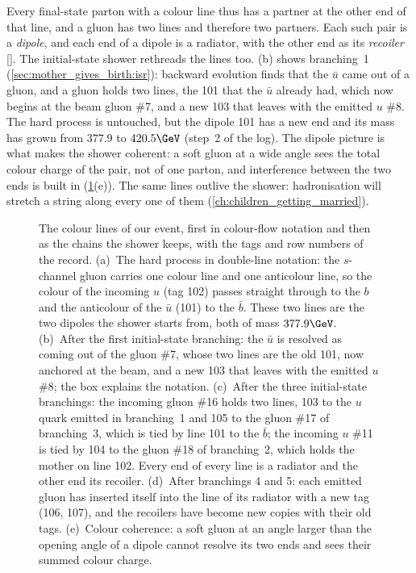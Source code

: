 Every final-state parton with a colour line thus has a partner at the
other end of that line, and a gluon has two lines and therefore two
partners. Each such pair is a \emph{dipole}, and each end of a dipole is a
radiator, with the other end as its \emph{recoiler} [].
The initial-state shower rethreads the lines too.
(b) shows branching~1
(\cref{sec:mother_gives_birth:isr}): backward evolution finds that the
$\bar u$ came out of a gluon, and a gluon holds two lines, the 101 that the
$\bar u$ already had, which now begins at the beam gluon \#7, and a new
103 that leaves with the emitted $u$ \#8. The hard process is untouched,
but the dipole 101 has a new end and its mass has grown from $377.9$ to
$420.5\GeV$ (step~2 of the log). The dipole picture is what makes the
shower coherent: a soft gluon at a wide angle sees the total colour charge
of the pair, not of one parton, and interference between the two ends is
built in (\cref{fig:mother_gives_birth:dipoles}(e)). The same lines
outlive the shower: hadronisation will stretch a string along every one of
them (\cref{ch:children_getting_married}).

\begin{figure}[htbp]\centering
\resizebox{\textwidth}{!}{}
\caption[Colour flow and dipoles of our event]{The colour lines of our
event, first in colour-flow notation and then as the chains the shower
keeps, with the tags and row numbers of the record. (a)~The hard process
in double-line notation: the $s$-channel gluon carries one colour line and
one anticolour line, so the colour of the incoming $u$ (tag 102) passes
straight through to the $b$ and the anticolour of the $\bar u$ (101) to
the $\bar b$. These two lines are the two dipoles the shower starts from,
both of mass $377.9\GeV$. (b)~After the first initial-state branching: the
$\bar u$ is resolved as coming out of the gluon \#7, whose two lines are
the old 101, now anchored at the beam, and a new 103 that leaves with the
emitted $u$ \#8; the box explains the notation. (c)~After the three
initial-state branchings: the incoming gluon \#16 holds two lines, 103 to
the $u$ quark emitted in branching~1 and 105 to the gluon \#17 of
branching~3, which is tied by line 101 to the $\bar b$; the incoming $u$
\#11 is tied by 104 to the gluon \#18 of branching~2, which holds the
mother on line 102. Every end of every line is a radiator and the other
end its recoiler. (d)~After branchings 4 and 5: each emitted gluon has
inserted itself into the line of its radiator with a new tag (106, 107),
and the recoilers have become new copies with their old tags. (e)~Colour
coherence: a soft gluon at an angle larger than the opening angle of a
dipole cannot resolve its two ends and sees their summed colour charge.}
\label{fig:mother_gives_birth:dipoles}
\end{figure}

